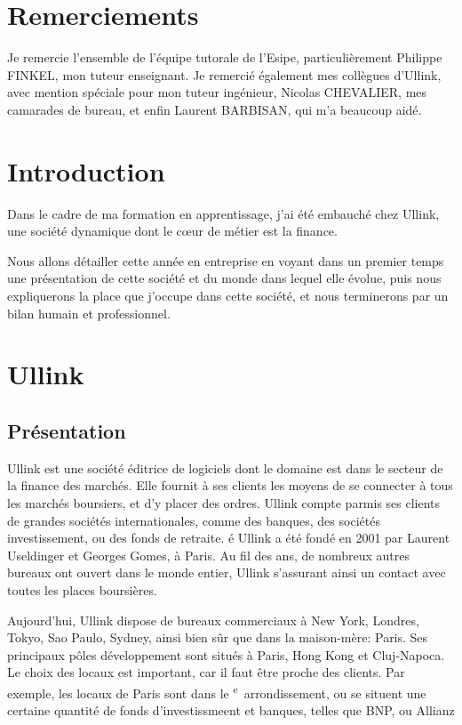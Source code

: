 \documentclass[a4paper, 12pt]{article}
\begin{document}

\pagebreak

\section*{Remerciements}
Je remercie l'ensemble de l'équipe tutorale de l'Esipe, particulièrement Philippe FINKEL, mon tuteur enseignant. Je remercié également mes collègues d'Ullink, avec mention spéciale pour mon tuteur ingénieur, Nicolas CHEVALIER, mes camarades de bureau, et enfin Laurent BARBISAN, qui m'a beaucoup aidé.

\pagebreak

\section*{Introduction}

Dans le cadre de ma formation en apprentissage, j'ai été embauché chez Ullink, une société dynamique dont le c\oe{}ur de métier est la finance.

Nous allons détailler cette année en entreprise en voyant dans un premier temps une présentation de cette société et du monde dans lequel elle évolue, puis nous expliquerons la place que j'occupe dans cette société, et nous terminerons par un bilan humain et professionnel.
\pagebreak
\tableofcontents
\pagebreak

\section{Ullink}
\subsection{Présentation}
Ullink est une société éditrice de logiciels dont le domaine est dans le secteur de la finance des marchés. Elle fournit à ses clients les moyens de se connecter à tous les marchés boursiers, et d'y placer des ordres. Ullink compte parmis ses clients de grandes sociétés internationales, comme des banques, des sociétés investissement, ou des fonds de retraite.
é
Ullink a été fondé en 2001 par Laurent Useldinger et Georges Gomes, à Paris. Au fil des ans, de nombreux autres bureaux ont ouvert dans le monde entier, Ullink s'assurant ainsi un contact avec toutes les places boursières.

Aujourd'hui, Ullink dispose de bureaux commerciaux à New York, Londres, Tokyo, Sao Paulo, Sydney, ainsi bien sûr que dans la maison-mère: Paris. Ses principaux pôles développement sont situés à Paris, Hong Kong et Cluj-Napoca. Le choix des locaux est important, car il faut être proche des clients. Par exemple, les locaux de Paris sont dans le \textsc{}\textsuperscript{e}~arrondissement, ou se situent une certaine quantité de fonds d'investissmeent et banques, telles que BNP, ou Allianz
\end{document}
